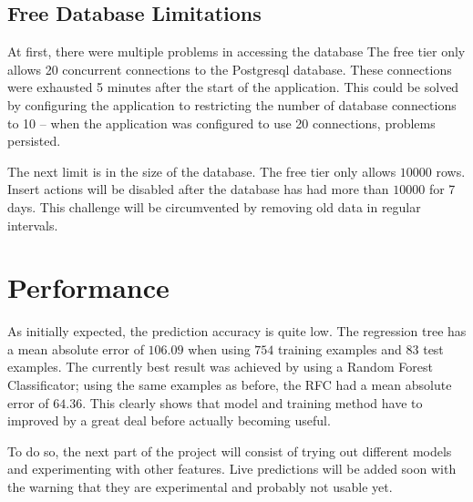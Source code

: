 \subsection{Free Database Limitations}
At first, there were multiple problems in accessing the database The free tier only allows 20 concurrent connections to the Postgresql database. These connections were exhausted 5 minutes after the start of the application. This could be solved by configuring the application to restricting the number of database connections to 10 -- when the application was configured to use 20 connections, problems persisted.

The next limit is in the size of the database. The free tier only allows \(10000\) rows. Insert actions will be disabled after the database has had more than \(10000\) for 7 days. This challenge will be circumvented by removing old data in regular intervals.



\section{Performance}
As initially expected, the prediction accuracy is quite low. The regression tree has a mean absolute error of \(106.09\) when using \(754\) training examples and \(83\) test examples. The currently best result was achieved by using a Random Forest Classificator; using the same examples as before, the RFC had a mean absolute error of \(64.36\). This clearly shows that model and training method have to improved by a great deal before actually becoming useful. 

To do so, the next part of the project will consist of trying out different models and experimenting with other features. Live predictions will be added soon with the warning that they are experimental and probably not usable yet.